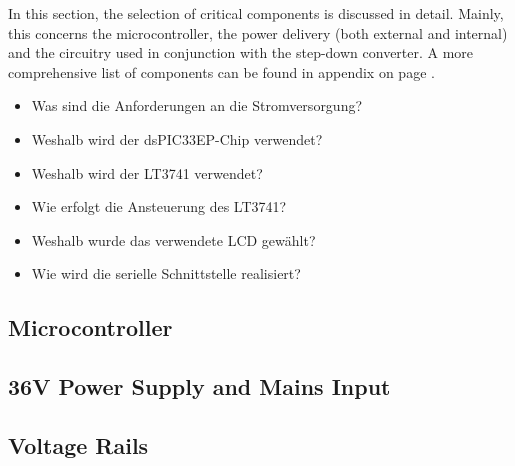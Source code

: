 In  this  section,  the  selection  of critical  components  is  discussed  in
detail. Mainly, this  concerns the  microcontroller, the power  delivery (both
external  and  internal)  and  the  circuitry used  in  conjunction  with  the
step-down converter. A more  comprehensive list of components can  be found in
appendix  on page .

\begin{itemize}
    \item
        Was sind die Anforderungen an die Stromversorgung?
    \item
        Weshalb wird der dsPIC33EP-Chip verwendet?
    \item
        Weshalb wird der LT3741 verwendet?
    \item
        Wie erfolgt die Ansteuerung des LT3741?
    \item
        Weshalb wurde das verwendete LCD gew\"ahlt?
    \item
        Wie wird die serielle Schnittstelle realisiert?
\end{itemize}

\subsection{Microcontroller}



\subsection{36V Power Supply and Mains Input}



\subsection{Voltage Rails}



